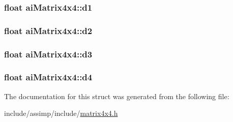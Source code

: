 \hypertarget{structai_matrix4x4_a13f3800d9106e3be6d0e60b794c5a5ae}{
\subsubsection[{d1}]{\setlength{\rightskip}{0pt plus 5cm}float ai\-Matrix4x4\-::d1}}\label{structai_matrix4x4_a13f3800d9106e3be6d0e60b794c5a5ae}
\hypertarget{structai_matrix4x4_a6f17ca1c7e4b9377d0e332f85aab282b}{
\subsubsection[{d2}]{\setlength{\rightskip}{0pt plus 5cm}float ai\-Matrix4x4\-::d2}}\label{structai_matrix4x4_a6f17ca1c7e4b9377d0e332f85aab282b}
\hypertarget{structai_matrix4x4_a8d2910f62b34b1e2ace93b55e4db4b92}{
\subsubsection[{d3}]{\setlength{\rightskip}{0pt plus 5cm}float ai\-Matrix4x4\-::d3}}\label{structai_matrix4x4_a8d2910f62b34b1e2ace93b55e4db4b92}
\hypertarget{structai_matrix4x4_ac0a65b51f126f7331b4f7dbbd82f3d63}{
\subsubsection[{d4}]{\setlength{\rightskip}{0pt plus 5cm}float ai\-Matrix4x4\-::d4}}\label{structai_matrix4x4_ac0a65b51f126f7331b4f7dbbd82f3d63}


The documentation for this struct was generated from the following file\-:\begin{DoxyCompactItemize}
\item 
include/assimp/include/\hyperlink{matrix4x4_8h}{matrix4x4.\-h}\end{DoxyCompactItemize}
